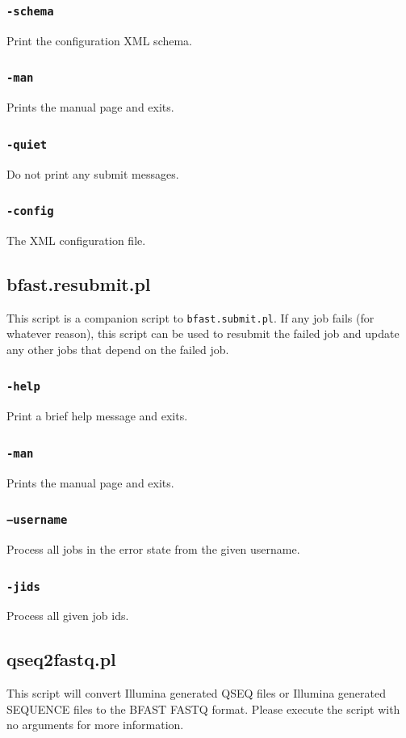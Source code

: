 \documentclass[a4paper,12pt]{book}
\newcommand{\TT}[1]{{\tt #1}} %
\begin{document}
\subsubsection{\TT{-schema}}
Print the configuration XML schema.
\subsubsection{\TT{-man}}
Prints the manual page and exits.
\subsubsection{\TT{-quiet}}
Do not print any submit messages.
\subsubsection{\TT{-config}}
The XML configuration file.
\subsection{bfast.resubmit.pl}
This script is a companion script to \TT{bfast.submit.pl}.
If any job fails (for whatever reason), this script can be used to resubmit the failed job and update any other jobs that depend on the failed job.
\subsubsection{\TT{-help}}
Print a brief help message and exits.
\subsubsection{\TT{-man}}
Prints the manual page and exits.
\subsubsection{\TT{−username}}
Process all jobs in the error state from the given username.
\subsubsection{\TT{-jids}}
Process all given job ids.

\subsection{qseq2fastq.pl}
This script will convert Illumina generated QSEQ files or Illumina generated SEQUENCE files to the BFAST FASTQ format.
Please execute the script with no arguments for more information.
\end{document}
